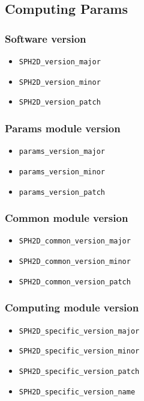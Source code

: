 \subsection{Computing Params}

\subsubsection{Software version}
\begin{itemize}
    \item \verb|SPH2D_version_major|
    \item \verb|SPH2D_version_minor|
    \item \verb|SPH2D_version_patch|
\end{itemize}

\subsubsection{Params module version}
\begin{itemize}
    \item \verb|params_version_major|
    \item \verb|params_version_minor|
    \item \verb|params_version_patch|
\end{itemize}

\subsubsection{Common module version}
\begin{itemize}
    \item \verb|SPH2D_common_version_major|
    \item \verb|SPH2D_common_version_minor|
    \item \verb|SPH2D_common_version_patch|
\end{itemize}

\subsubsection{Computing module version}
\begin{itemize}
    \item \verb|SPH2D_specific_version_major|
    \item \verb|SPH2D_specific_version_minor|
    \item \verb|SPH2D_specific_version_patch|
    \item \verb|SPH2D_specific_version_name|
\end{itemize}

